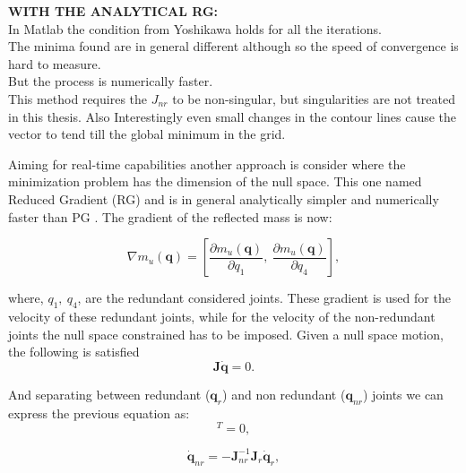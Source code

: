 \textbf{WITH THE ANALYTICAL RG:}\\
In Matlab the condition from Yoshikawa holds for all the iterations.  \\
The minima found are in general different although so the speed of convergence is hard to measure.  \\
But the process is numerically faster. \\
This method requires the $J_{nr}$ to be non-singular, but singularities are not treated in this thesis. 
Also Interestingly even small changes in the contour lines cause the vector to tend till the global minimum in the grid.

Aiming for real-time capabilities another approach is consider where the minimization problem has the dimension of the null space. This one named Reduced Gradient (RG) and is in general  analytically simpler and numerically faster than PG \cite{reduced_gradient}.
The gradient of the reflected mass is now:

\begin{equation}
\nabla m_u(\mathbf{q}) = \left[
\frac{\partial {m_u(\mathbf{q})}}{\partial {q_1}}, \   \frac{\partial {m_u(\mathbf{q})}}{\partial {q_4}} \right], \label{eq:grad_refl_mass_RG}
\end{equation}

where,  $q_1 , \ q_4$,  are the redundant considered joints. These gradient is used for the velocity of these redundant joints, while for the velocity of the non-redundant joints the null space constrained has to be imposed. Given a null space motion, the following is satisfied
\begin{equation}
\mathbf{J} \dot{\mathbf{q}} = 0 .
\label{eq:ns_motion}
\end{equation}

And separating between redundant (${\mathbf{q}}_{r}$) and non redundant (${\mathbf{q}}_{nr}$) joints we can express the previous equation as:
\begin{equation}
[\mathbf{J}_r, \ \mathbf{J}_{nr}] [\mathbf{\dot{q}}_r, \  \dot{\mathbf{q}}_{nr}]^T = 0    ,
\label{eq:}
\end{equation}

\begin{equation}
\dot{\mathbf{q}}_{nr} =  - \mathbf{J}_{nr}^{-1} \mathbf{J}_r \mathbf{\dot{q}}_r    ,
\label{eq:ns_constraint}
\end{equation}

